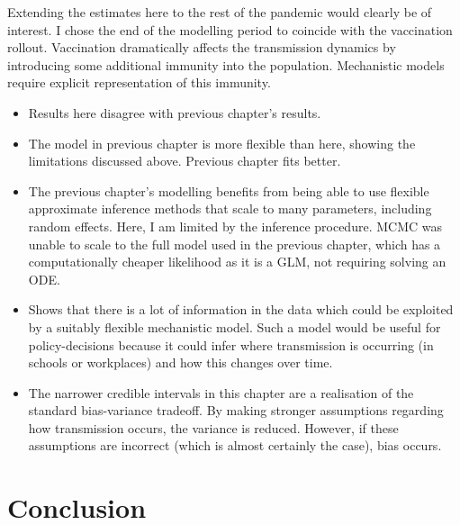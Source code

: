 \documentclass[thesis.tex]{subfiles}
\begin{document}
Extending the estimates here to the rest of the pandemic would clearly be of interest.
I chose the end of the modelling period to coincide with the vaccination rollout.
Vaccination dramatically affects the transmission dynamics by introducing some additional immunity into the population.
Mechanistic models require explicit representation of this immunity.


\begin{itemize}
    \item Results here disagree with previous chapter's results.
    \item The model in previous chapter is more flexible than here, showing the limitations discussed above. Previous chapter fits better.
    \item The previous chapter's modelling benefits from being able to use flexible approximate inference methods that scale to many parameters, including random effects. Here, I am limited by the inference procedure. MCMC was unable to scale to the full model used in the previous chapter, which has a computationally cheaper likelihood as it is a GLM, not requiring solving an ODE.
    \item Shows that there is a lot of information in the data which could be exploited by a suitably flexible mechanistic model. Such a model would be useful for policy-decisions because it could infer where transmission is occurring (\eg in schools or workplaces) and how this changes over time.
    \item The narrower credible intervals in this chapter are a realisation of the standard bias-variance tradeoff. By making stronger assumptions regarding how transmission occurs, the variance is reduced. However, if these assumptions are incorrect (which is almost certainly the case), bias occurs.
\end{itemize}

\section{Conclusion}


\ifSubfilesClassLoaded{
  \listoftodos
}{}
\end{document}
